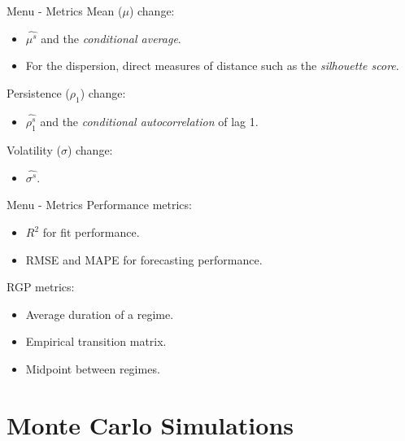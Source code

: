 \documentclass[
  ignorenonframetext,
]{beamer}
\providecommand{\tightlist}{%
  \setlength{\itemsep}{0pt}\setlength{\parskip}{0pt}}\usepackage{longtable,booktabs,array}
\begin{document}
\begin{frame}{Menu - Metrics}
\label{menu---metrics-1}
Mean (\(\mu\)) change:

\begin{itemize}
\tightlist
\item
  \(\widehat{\mu^s}\) and the \emph{conditional average}.
\item
  For the dispersion, direct measures of distance such as the
  \emph{silhouette score}.
\end{itemize}

Persistence (\(\rho_1\)) change:

\begin{itemize}
\tightlist
\item
  \(\widehat{\rho_1^s}\) and the \emph{conditional autocorrelation} of
  lag 1.
\end{itemize}

Volatility (\(\sigma\)) change:

\begin{itemize}
\tightlist
\item
  \(\widehat{\sigma^s}\).
\end{itemize}
\end{frame}

\begin{frame}{Menu - Metrics}
\label{menu---metrics-2}
Performance metrics:

\begin{itemize}
\tightlist
\item
  \(R^2\) for fit performance.
\item
  RMSE and MAPE for forecasting performance.
\end{itemize}

RGP metrics:

\begin{itemize}
\tightlist
\item
  Average duration of a regime.
\item
  Empirical transition matrix.
\item
  Midpoint between regimes.
\end{itemize}
\end{frame}

\section{Monte Carlo Simulations}\label{monte-carlo-simulations}
\end{document}
